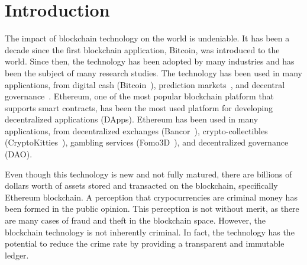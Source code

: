 






\chapter{Introduction} \label{sec:intro}

The impact of blockchain technology on the world is undeniable. It has been a decade since the first blockchain application, Bitcoin, was introduced to the world. Since then, the technology has been adopted by many industries and has been the subject of many research studies. The technology has been used in many applications, from digital cash (\eg Bitcoin~\cite{nakamoto2008bitcoin}), prediction markets~\cite{clark2014decentralizing}, and decentral governance~\cite{aragonwebsite}. Ethereum, one of the most popular blockchain platform that supports smart contracts, has been the most used platform for developing decentralized applications (DApps). Ethereum has been used in many applications, from decentralized exchanges (\eg Bancor~\cite{bancor}), crypto-collectibles (\eg CryptoKitties~\cite{cryptokitties}), gambling services (\eg Fomo3D~\cite{fomo3d}), and decentralized governance (\eg DAO).

Even though this technology is new and not fully matured, there are billions of dollars worth of assets stored and transacted on the blockchain, specifically Ethereum blockchain. A perception that crypocurrencies are criminal money has been formed in the public opinion. This perception is not without merit, as there are many cases of fraud and theft in the blockchain space. However, the blockchain technology is not inherently criminal. In fact, the technology has the potential to reduce the crime rate by providing a transparent and immutable ledger.

